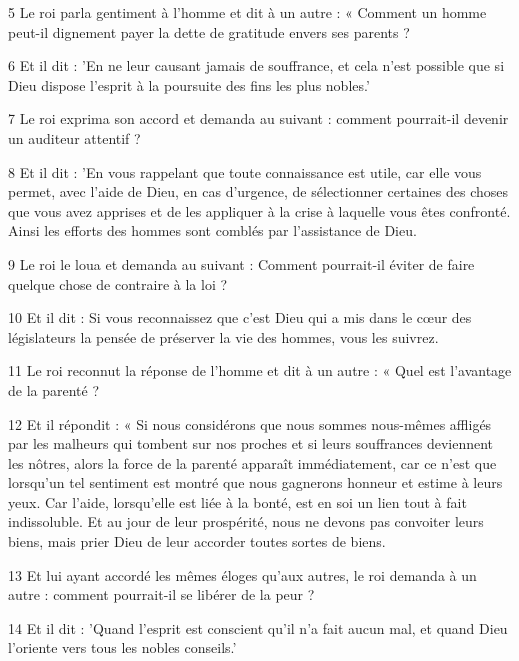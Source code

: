 \par 5 Le roi parla gentiment à l'homme et dit à un autre : « Comment un homme peut-il dignement payer la dette de gratitude envers ses parents ?

\par 6 Et il dit : 'En ne leur causant jamais de souffrance, et cela n'est possible que si Dieu dispose l'esprit à la poursuite des fins les plus nobles.'

\par 7 Le roi exprima son accord et demanda au suivant : comment pourrait-il devenir un auditeur attentif ?

\par 8 Et il dit : 'En vous rappelant que toute connaissance est utile, car elle vous permet, avec l'aide de Dieu, en cas d'urgence, de sélectionner certaines des choses que vous avez apprises et de les appliquer à la crise à laquelle vous êtes confronté. Ainsi les efforts des hommes sont comblés par l'assistance de Dieu.

\par 9 Le roi le loua et demanda au suivant : Comment pourrait-il éviter de faire quelque chose de contraire à la loi ?

\par 10 Et il dit : Si vous reconnaissez que c'est Dieu qui a mis dans le cœur des législateurs la pensée de préserver la vie des hommes, vous les suivrez.

\par 11 Le roi reconnut la réponse de l'homme et dit à un autre : « Quel est l'avantage de la parenté ?

\par 12 Et il répondit : « Si nous considérons que nous sommes nous-mêmes affligés par les malheurs qui tombent sur nos proches et si leurs souffrances deviennent les nôtres, alors la force de la parenté apparaît immédiatement, car ce n'est que lorsqu'un tel sentiment est montré que nous gagnerons honneur et estime à leurs yeux. Car l'aide, lorsqu'elle est liée à la bonté, est en soi un lien tout à fait indissoluble. Et au jour de leur prospérité, nous ne devons pas convoiter leurs biens, mais prier Dieu de leur accorder toutes sortes de biens.

\par 13 Et lui ayant accordé les mêmes éloges qu'aux autres, le roi demanda à un autre : comment pourrait-il se libérer de la peur ?

\par 14 Et il dit : 'Quand l'esprit est conscient qu'il n'a fait aucun mal, et quand Dieu l'oriente vers tous les nobles conseils.'


